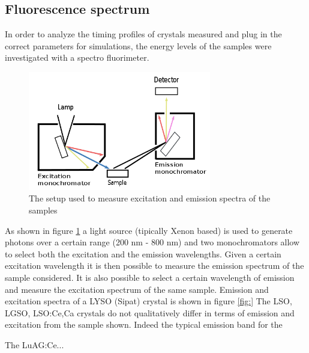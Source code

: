 \subsection{Fluorescence spectrum}
In order to analyze the timing profiles of crystals measured and plug in the correct parameters for simulations, 
the energy levels of the samples were investigated with a spectro fluorimeter.
\begin{figure}[htbp]
\begin{center}
\includegraphics[width=8cm]{../Pictures/Chapter_5/fluo.png}
\end{center}
\caption[Spectro fluorimeter]{The setup used to measure excitation and emission spectra of the samples}
\label{fig:emission}
\end{figure}
 
As shown in figure \ref{fig:emission} a light source (tipically Xenon based) is used to generate photons over a certain range (200 nm - 800 nm) and two monochromators allow to select both the excitation and the emission wavelengths. 
Given a certain excitation wavelength it is then possible to measure the emission spectrum of the sample considered.
It is also possible to select a certain wavelength of emission and measure the excitation spectrum of the same sample.
Emission and excitation spectra of a LYSO (Sipat) crystal is shown in figure \ref{fig:}
The LSO, LGSO, LSO:Ce,Ca crystals do not qualitatively differ in terms of emission and excitation from the sample shown. 
Indeed the typical emission band for the 

The LuAG:Ce...

